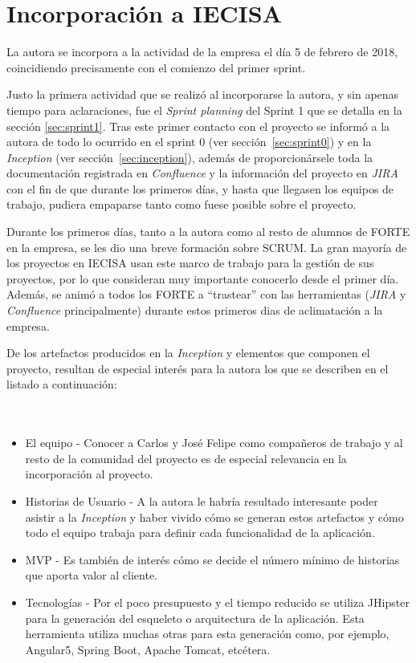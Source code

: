 \section{Incorporación a IECISA}
\label{sec:incorporacion}

La autora se incorpora a la actividad de la empresa el día 5 de febrero de 2018, coincidiendo precisamente con el comienzo del primer sprint. 

Justo la primera actividad que se realizó al incorporarse la autora, y sin apenas tiempo para aclaraciones, fue el \emph{Sprint planning} del Sprint 1 que se detalla en la sección \ref{sec:sprint1}. Tras este primer contacto con el proyecto se informó a la autora de todo lo ocurrido en el sprint 0 (ver sección~\ref{sec:sprint0}) y en la \emph{Inception} (ver sección~\ref{sec:inception}), además de proporcionársele toda la documentación registrada en \emph{Confluence} y la información del proyecto en \emph{JIRA} con el fin de que durante los primeros días, y hasta que llegasen los equipos de trabajo, pudiera empaparse tanto como fuese posible sobre el proyecto.

Durante los primeros días, tanto a la autora como al resto de alumnos de FORTE en la empresa, se les dio una breve formación sobre SCRUM. La gran mayoría de los proyectos en IECISA usan este marco de trabajo para la gestión de sus proyectos, por lo que consideran muy importante conocerlo desde el primer día. Además, se animó a todos los FORTE a ``trastear'' con las herramientas (\emph{JIRA} y \emph{Confluence} principalmente) durante estos primeros dias de aclimatación a la empresa.

De los artefactos producidos en la \emph{Inception} y elementos que componen el proyecto, resultan de especial interés para la autora los que se describen en el listado a continuación:
\\
\\
\\
\begin{itemize}
\item El equipo - Conocer a Carlos y José Felipe como compañeros de trabajo y al resto de la comunidad del proyecto es de especial relevancia en la incorporación al proyecto.
\item Historias de Usuario - A la autora le habría resultado interesante poder asistir a la \emph{Inception} y haber vivido cómo se generan estos artefactos y cómo todo el equipo trabaja para definir cada funcionalidad de la aplicación.
\item MVP - Es también de interés cómo se decide el número mínimo de historias que aporta valor al cliente.
\item Tecnologías - Por el poco presupuesto y el tiempo reducido se utiliza JHipster para la generación del esqueleto o arquitectura de la aplicación. Esta herramienta utiliza muchas otras para esta generación como, por ejemplo, Angular5, Spring Boot, Apache Tomcat, etcétera.
\end{itemize}

